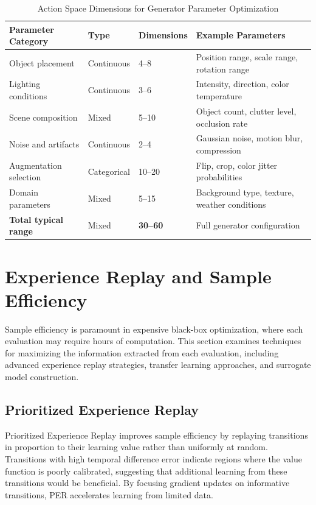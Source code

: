 \begin{table}[htbp]
\centering
\caption{Action Space Dimensions for Generator Parameter Optimization}
\label{tab:action_space}
\renewcommand{\arraystretch}{1.3}
\begin{tabular}{|p{3.5cm}|p{2.0cm}|p{2.5cm}|p{4.0cm}|}
\hline
\textbf{Parameter Category} & \textbf{Type} & \textbf{Dimensions} & \textbf{Example Parameters} \\
\hline
Object placement & Continuous & 4--8 & Position range, scale range, rotation range \\
\hline
Lighting conditions & Continuous & 3--6 & Intensity, direction, color temperature \\
\hline
Scene composition & Mixed & 5--10 & Object count, clutter level, occlusion rate \\
\hline
Noise and artifacts & Continuous & 2--4 & Gaussian noise, motion blur, compression \\
\hline
Augmentation selection & Categorical & 10--20 & Flip, crop, color jitter probabilities \\
\hline
Domain parameters & Mixed & 5--15 & Background type, texture, weather conditions \\
\hline
\textbf{Total typical range} & Mixed & \textbf{30--60} & Full generator configuration \\
\hline
\end{tabular}
\end{table}


\section{Experience Replay and Sample Efficiency}
\label{sec:experience_replay}

Sample efficiency is paramount in expensive black-box optimization, where each evaluation may require hours of computation. This section examines techniques for maximizing the information extracted from each evaluation, including advanced experience replay strategies, transfer learning approaches, and surrogate model construction.

\subsection{Prioritized Experience Replay}
\label{subsec:per}

Prioritized Experience Replay improves sample efficiency by replaying transitions in proportion to their learning value rather than uniformly at random. Transitions with high temporal difference error indicate regions where the value function is poorly calibrated, suggesting that additional learning from these transitions would be beneficial. By focusing gradient updates on informative transitions, PER accelerates learning from limited data.

